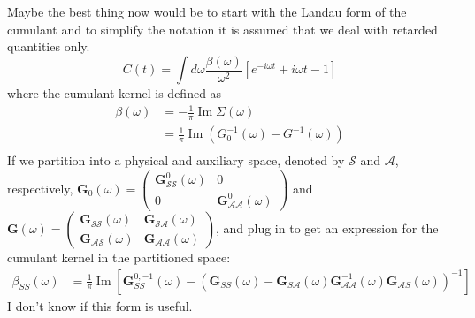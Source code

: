 Maybe the best thing now would be to start with the Landau form of the cumulant and to simplify the notation it is assumed that we deal with retarded quantities only.
\begin{equation}
    C(t)=\int d \omega \frac{\beta(\omega)}{\omega^2}\left[e^{-i \omega t}+i \omega t-1\right]
\end{equation}
where the cumulant kernel is defined as
\begin{align}
    \beta(\omega)&=-\frac{1}{\pi} \operatorname{Im} \Sigma(\omega) \\
    &=\frac{1}{\pi} \operatorname{Im} \left(G_0^{-1}(\omega) - G^{-1}(\omega) \right) \\
\end{align}
 If we partition into a physical and auxiliary space, denoted by $\mathcal{S}$ and $\mathcal{A}$, respectively, $\bm{G}_0(\omega)= \begin{pmatrix} \bm{G}^0_{\mathcal{S}\mathcal{S}}(\omega) & 0 \\ 0 & \bm{G}^0_{\mathcal{A}\mathcal{A}}(\omega) \end{pmatrix}$ and $\bm{G}(\omega)= \begin{pmatrix} \bm{G}_{\mathcal{S}\mathcal{S}}(\omega) & \bm{G}_{\mathcal{S}\mathcal{A}}(\omega) \\ \bm{G}_{\mathcal{A}\mathcal{S}}(\omega) & \bm{G}_{\mathcal{A}\mathcal{A}}(\omega) \end{pmatrix}$, and plug in to get an expression for the cumulant kernel in the partitioned space:
\begin{align}
    \beta_{S S}(\omega)&=\frac{1}{\pi} \operatorname{Im}\left[\mathbf{G}_{S S}^{0,-1}(\omega)-\left(\mathbf{G}_{S S}(\omega)-\mathbf{G}_{S \mathcal{A}}(\omega) \mathbf{G}_{\mathcal{A} \mathcal{A}}^{-1}(\omega) \mathbf{G}_{\mathcal{A} S}(\omega)\right)^{-1}\right]
\end{align}
I don't know if this form is useful.
